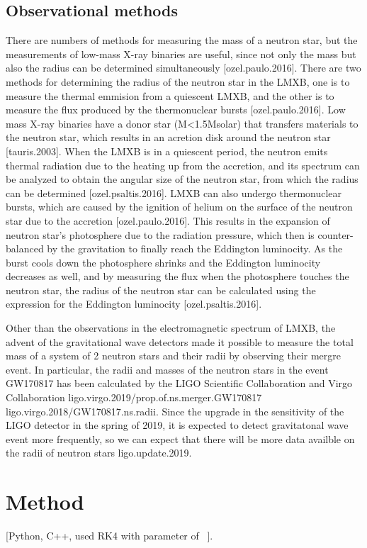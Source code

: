 \documentclass[11pt]{article}
\begin{document}
\subsection{Observational methods}
There are numbers of methods for measuring the mass of a neutron star, but the measurements of low-mass X-ray binaries are useful, since not only the mass but also the radius can be determined simultaneously [ozel.paulo.2016]. There are two methods for determining the radius of the neutron star in the LMXB, one is to measure the thermal emmision from a quiescent LMXB, and the other is to measure the flux produced by the thermonuclear bursts [ozel.paulo.2016]. 
Low mass X-ray binaries have a donor star (M<1.5Msolar) that transfers materials to the neutron star, which results in an acretion disk around the neutron star [tauris.2003]. When the LMXB is in a quiescent period, the neutron emits thermal radiation due to the heating up from the accretion, and its spectrum can be analyzed to obtain the angular size of the neutron star, from which the radius can be determined [ozel.psaltis.2016].
LMXB can also undergo thermonuclear bursts, which are caused by the ignition of helium on the surface of the neutron star due to the accretion [ozel.paulo.2016]. This results in the expansion of neutron star's photosphere due to the radiation pressure, which then is counter-balanced by the gravitation to finally reach the Eddington luminocity. As the burst cools down the photosphere shrinks and the Eddington luminocity decreases as well, and by measuring the flux when the photosphere touches the neutron star, the radius of the neutron star can be calculated using the expression for the Eddington luminocity [ozel.psaltis.2016].

Other than the observations in the electromagnetic spectrum of LMXB, the advent of the gravitational wave detectors made it possible to measure the total mass of a system of 2 neutron stars and their radii by observing their mergre event. In particular, the  radii and masses of the neutron stars in the event GW170817 has been calculated by the LIGO Scientific Collaboration and Virgo Collaboration {ligo.virgo.2019/prop.of.ns.merger.GW170817} {ligo.virgo.2018/GW170817.ns.radii}. Since the upgrade in the sensitivity of the LIGO detector in the spring of 2019, it is expected to detect gravitatonal wave event more frequently, so we can expect that there will be more data availble on the radii of neutron stars {ligo.update.2019}.

\section{Method}
[Python, C++, used RK4 with parameter of ~].
\end{document}
